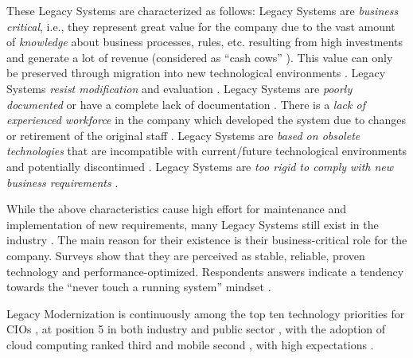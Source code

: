 These \glspl{Legacy System} are characterized as follows: \glspl{Legacy System} are \emph{business critical}, i.e., they represent great value for the company due to the vast amount of \emph{knowledge} about business processes, rules, etc.
\autocite{Aversano2001,Sneed2010SoftwareMigration,Wagner2014} resulting from high investments \autocite{Lucia2009METAMORPHOS} and generate a lot of revenue (considered as ``cash cows'' \autocite{Khadka2014ProfessionalsModernization}).
This value can only be preserved through migration into new technological environments \autocite{Fuhr2013SOAMIG}.
\glspl{Legacy System} \emph{resist modification} and evaluation \autocite{Bisbal1999LegacyInformationSystems}.
\glspl{Legacy System} are \emph{poorly documented} or have a complete lack of documentation \autocite{Sneed2010SoftwareMigration,warren2012renaissance,Batlajery2014IndustrialSurveyModernization,Lucia2008}.
There is a \emph{lack of experienced workforce} in the company which developed the system \autocite{Batlajery2014IndustrialSurveyModernization} due to changes or retirement of the original staff \autocite{Lucia2008}.
\glspl{Legacy System} are \emph{based on obsolete technologies} that are incompatible with current/future technological environments and potentially discontinued \autocite{Perez-Castillo2013PRECISO,Batlajery2014IndustrialSurveyModernization,Heil2016AWSM}.
\glspl{Legacy System} are \emph{too rigid to comply with new business requirements} \autocite{Batlajery2014IndustrialSurveyModernization}.

While the above characteristics cause high effort for maintenance and implementation of new requirements, many \glspl{Legacy System} still exist in the industry \autocite{Fuhr2013SOAMIG}.
The main reason for their existence is their business-critical role for the company.
Surveys \autocite{Khadka2014ProfessionalsModernization,Batlajery2014IndustrialSurveyModernization} show that they are perceived as stable, reliable, proven technology and performance-optimized.
Respondents answers indicate a tendency towards the ``never touch a running system'' mindset \autocite{Batlajery2014IndustrialSurveyModernization}.

\Gls{Legacy Modernization} is continuously among the top ten technology priorities for CIOs \autocite{Gartner2013CIOAgenda}, at position 5 in both industry \autocite{Gartner2013Priorities} and public sector \autocite{NASCIO2016}, with the adoption of cloud computing ranked third \autocite{Gartner2013Priorities,NASCIO2016} and mobile second \autocite{Gartner2013Priorities}, with high expectations \autocite{ForresterResearch2011Modernization}.

